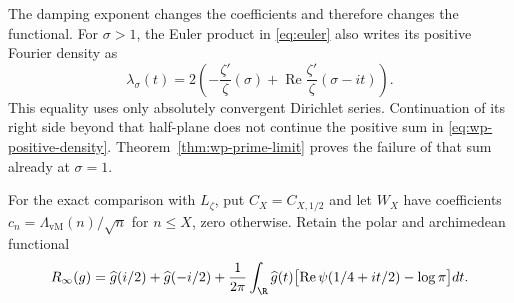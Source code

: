The damping exponent changes the coefficients and therefore changes the
functional.
For $\sigma>1$, the Euler product in \eqref{eq:euler} also writes its
positive Fourier density as
\[
 \lambda_\sigma(t)=2\left(-\frac{\zeta'}{\zeta}(\sigma)
       +\operatorname{Re}\frac{\zeta'}{\zeta}(\sigma-it)\right).
\]
This equality uses only absolutely convergent Dirichlet series.
Continuation of its right side beyond that half-plane does not continue
the positive sum in \eqref{eq:wp-positive-density}.
Theorem~\ref{thm:wp-prime-limit} proves the failure of that sum already
at $\sigma=1$.

For the exact comparison with $L_\zeta$, put
$C_X=C_{X,1/2}$ and let $W_X$ have coefficients
$c_n=\Lambda_{\mathrm{vM}}(n)/\sqrt n$ for $n\leq X$, zero otherwise.
Retain the polar and archimedean functional
\[
 R_\infty(g)=\widehat g(i/2)+\widehat g(-i/2)
  +\frac1{2\pi}\int_{\R}\widehat g(t)
       \bigl[\operatorname{Re}\psi(1/4+it/2)-\log\pi\bigr]dt.
\]

